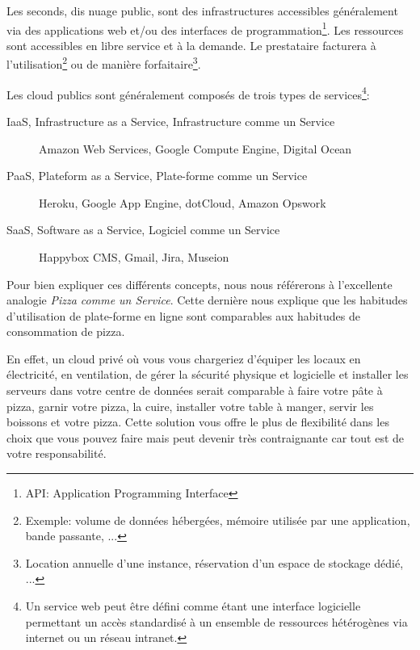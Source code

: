 \documentclass[11pt, a4paper ]{article}
\begin{document}
\begin{spacing}{1.5}
Les seconds, dis nuage public, sont des infrastructures accessibles généralement via des applications web et/ou des interfaces de programmation\footnote{API: Application Programming Interface}. Les ressources sont accessibles en libre service et à la demande. Le prestataire facturera à l'utilisation\footnote{Exemple: volume de données hébergées, mémoire utilisée par une application, bande passante, ...} ou de manière forfaitaire\footnote{Location annuelle d'une instance, réservation d'un espace de stockage dédié, ...}.

Les cloud publics sont généralement composés de trois types de services\footnote{Un service web\cite{webServicesDef} peut être défini comme étant une interface logicielle permettant un accès standardisé à un ensemble de ressources hétérogènes via internet ou un réseau intranet.}:
\begin{description}

	\item[IaaS, Infrastructure as a Service, Infrastructure comme un Service] Amazon Web Services, Google Compute Engine, Digital Ocean

	\item[PaaS, Plateform as a Service, Plate-forme comme un Service] Heroku, Google App Engine, dotCloud, Amazon Opswork

	\item[SaaS, Software as a Service, Logiciel comme un Service]
	Happybox CMS, Gmail, Jira, Museion

\end{description}

Pour bien expliquer ces différents concepts, nous nous référerons à l'excellente analogie \emph{Pizza comme un Service}\cite{PizzaasaService}. Cette dernière nous explique que les habitudes d'utilisation de plate-forme en ligne sont comparables aux habitudes de consommation de pizza.

En effet, un cloud privé où vous vous chargeriez d'équiper les locaux en électricité, en ventilation, de gérer la sécurité physique et logicielle et installer les serveurs dans votre centre de données serait comparable à faire votre pâte à pizza, garnir votre pizza, la cuire, installer votre table à manger, servir les boissons et votre pizza. Cette solution vous offre le plus de flexibilité dans les choix que vous pouvez faire mais peut devenir très contraignante car tout est de votre responsabilité.


\end{spacing}
\end{document}

